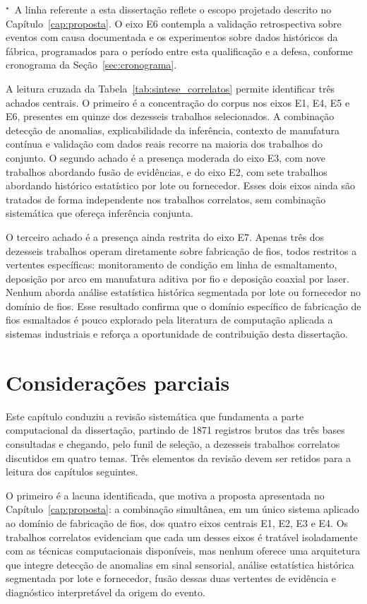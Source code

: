 \noindent$^{\star}$~A linha referente a esta dissertação reflete o escopo projetado descrito no Capítulo~\ref{cap:proposta}. O eixo E6 contempla a validação retrospectiva sobre eventos com causa documentada e os experimentos sobre dados históricos da fábrica, programados para o período entre esta qualificação e a defesa, conforme cronograma da Seção~\ref{sec:cronograma}.

A leitura cruzada da Tabela~\ref{tab:sintese_correlatos} permite identificar três achados centrais. O primeiro é a concentração do corpus nos eixos E1, E4, E5 e E6, presentes em quinze dos dezesseis trabalhos selecionados. A combinação detecção de anomalias, explicabilidade da inferência, contexto de manufatura contínua e validação com dados reais recorre na maioria dos trabalhos do conjunto. O segundo achado é a presença moderada do eixo E3, com nove trabalhos abordando fusão de evidências, e do eixo E2, com sete trabalhos abordando histórico estatístico por lote ou fornecedor. Esses dois eixos ainda são tratados de forma independente nos trabalhos correlatos, sem combinação sistemática que ofereça inferência conjunta.

O terceiro achado é a presença ainda restrita do eixo E7. Apenas três dos dezesseis trabalhos operam diretamente sobre fabricação de fios, todos restritos a vertentes específicas: monitoramento de condição em linha de esmaltamento, deposição por arco em manufatura aditiva por fio e deposição coaxial por laser. Nenhum aborda análise estatística histórica segmentada por lote ou fornecedor no domínio de fios. Esse resultado confirma que o domínio específico de fabricação de fios esmaltados é pouco explorado pela literatura de computação aplicada a sistemas industriais e reforça a oportunidade de contribuição desta dissertação.

\section{Considerações parciais}
\label{sec:consideracoes_cap3}

Este capítulo conduziu a revisão sistemática que fundamenta a parte computacional da dissertação, partindo de 1871 registros brutos das três bases consultadas e chegando, pelo funil de seleção, a dezesseis trabalhos correlatos discutidos em quatro temas. Três elementos da revisão devem ser retidos para a leitura dos capítulos seguintes.

O primeiro é a lacuna identificada, que motiva a proposta apresentada no Capítulo~\ref{cap:proposta}: a combinação simultânea, em um único sistema aplicado ao domínio de fabricação de fios, dos quatro eixos centrais E1, E2, E3 e E4. Os trabalhos correlatos evidenciam que cada um desses eixos é tratável isoladamente com as técnicas computacionais disponíveis, mas nenhum oferece uma arquitetura que integre detecção de anomalias em sinal sensorial, análise estatística histórica segmentada por lote e fornecedor, fusão dessas duas vertentes de evidência e diagnóstico interpretável da origem do evento.

